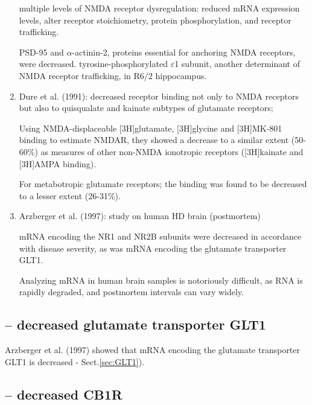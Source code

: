 \begin{enumerate}
 multiple levels of NMDA receptor dysregulation: reduced mRNA expression levels,
 alter receptor stoichiometry, protein phosphorylation, and receptor
 trafficking.
  
  PSD-95 and $\alpha$-actinin-2, proteins essential for anchoring NMDA
  receptors, were decreased. tyrosine-phosphorylated $\varepsilon$1 subunit,
  another determinant of NMDA receptor trafficking, in R6/2 hippocampus. 
  
   

  \item Dure et al. (1991):   decreased receptor binding not only to NMDA
  receptors but also to quisqualate and kainate subtypes of glutamate receptors; 
   
  Using NMDA-displaceable [3H]glutamate, [3H]glycine and [3H]MK-801 binding to
  estimate NMDAR, they showed a decrease to a similar extent (50-60\%) as
  measures of other non-NMDA ionotropic receptors ([3H]kainate and [3H]AMPA
  binding). 
  
  For metabotropic glutamate receptors; the binding was found to be decreased to
  a lesser extent (26-31\%).

  \item Arzberger et al. (1997): study on human HD brain (postmortem)
  
  mRNA encoding the NR1 and NR2B subunits were decreased in accordance with
  disease severity, as was mRNA encoding the glutamate transporter GLT1.
    
  Analyzing mRNA in human brain samples is notoriously difficult, as RNA is
  rapidly degraded, and postmortem intervals can vary widely.
\end{enumerate}

\subsection{-- decreased glutamate transporter GLT1}

Arzberger et al. (1997) showed that mRNA encoding the glutamate transporter GLT1
is decreased - Sect.\ref{sec:GLT1}).

\subsection{-- decreased CB1R}

